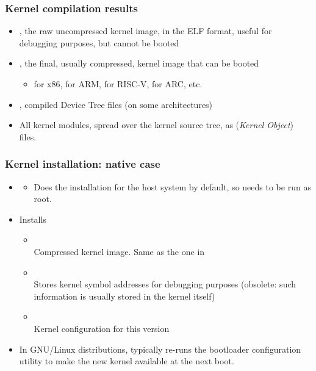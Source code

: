 \begin{frame}
  \frametitle{Kernel compilation results}
  \begin{itemize}
    \item {}, the raw uncompressed kernel image, in the
      ELF format, useful for debugging purposes, but cannot be booted
    \item {}, the final, usually
      compressed, kernel image that can be booted
      \begin{itemize}
      \item {} for x86,  for ARM,
       for RISC-V,  for ARC, etc.
      \end{itemize}
    \item {}, compiled Device Tree
      files (on some architectures)
    \item All kernel modules, spread over the kernel source tree, as
       ({\em Kernel Object}) files.
  \end{itemize}
\end{frame}

\begin{frame}
  \frametitle{Kernel installation: native case}
  \begin{itemize}
  \item {}
    \begin{itemize}
    \item Does the installation for the host system by default, so
      needs to be run as root.
    \end{itemize}
  \item Installs
    \begin{itemize}
    \item {} \\
      Compressed kernel image. Same as the one in
    \item {}\\
      Stores kernel symbol addresses for debugging purposes
      (obsolete: such information is usually stored in the kernel itself)
    \item {}\\
      Kernel configuration for this version
    \end{itemize}
  \item In GNU/Linux distributions, typically re-runs the bootloader configuration
    utility to make the new kernel available at the next boot.
  \end{itemize}
\end{frame}

